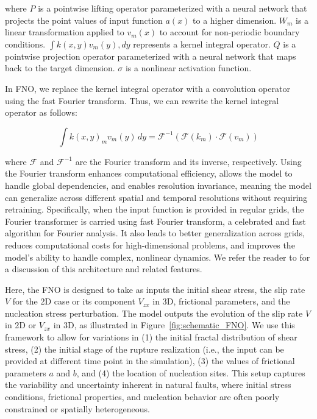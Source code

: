 \documentclass[draft]{agujournal2019}
\begin{document}
where $P$ is a pointwise lifting operator parameterized with a neural network that projects the point values of input function $a(x)$ to a higher dimension. $W_m$ is a linear transformation applied to $v_m(x)$ to account for non-periodic boundary conditions. $\int k(x,y) v_m(y),dy$ represents a kernel integral operator. $Q$ is a pointwise projection operator parameterized with a neural network that maps back to the target dimension. $\sigma$ is a nonlinear activation function.

In FNO, we replace the kernel integral operator with a convolution operator using the fast Fourier transform. Thus, we can rewrite the kernel integral operator as follows:

\begin{equation}
\label{eqn:kernel}
    \int k(x,y)_{m} v_{m}(y)\,dy  = \mathcal{F}^{-1}(\mathcal{F}(k_m) \cdot \mathcal{F}(v_m))
\end{equation}

where $\mathcal{F}$ and $\mathcal{F}^{-1}$ are the Fourier transform and its inverse, respectively. Using the Fourier transform enhances computational efficiency, allows the model to handle global dependencies, and enables resolution invariance, meaning the model can generalize across different spatial and temporal resolutions without requiring retraining. Specifically, when the input function is provided in regular grids, the Fourier transformer is carried using fast Fourier transform, a celebrated and fast algorithm for Fourier analysis. It also leads to better generalization across grids, reduces computational costs for high-dimensional problems, and improves the model's ability to handle complex, nonlinear dynamics. We refer the reader to \cite{li2020fourier} for a discussion of this architecture and related features.

Here, the FNO is designed to take as inputs the initial shear stress, the slip rate \(V\) for the 2D case or its component \(V_{zx}\) in 3D, frictional parameters, and the nucleation stress perturbation. The model outputs the evolution of the slip rate \(V\) in 2D or \(V_{zx}\) in 3D, as illustrated in Figure~\ref{fig:schematic_FNO}. We use this framework to allow for variations in (1) the initial fractal distribution of shear stress, (2) the initial stage of the rupture realization (i.e., the input can be provided at different time point in the simulation), (3) the values of frictional parameters \(a\) and \(b\), and (4) the location of nucleation sites. This setup captures the variability and uncertainty inherent in natural faults, where initial stress conditions, frictional properties, and nucleation behavior are often poorly constrained or spatially heterogeneous.
\end{document}
